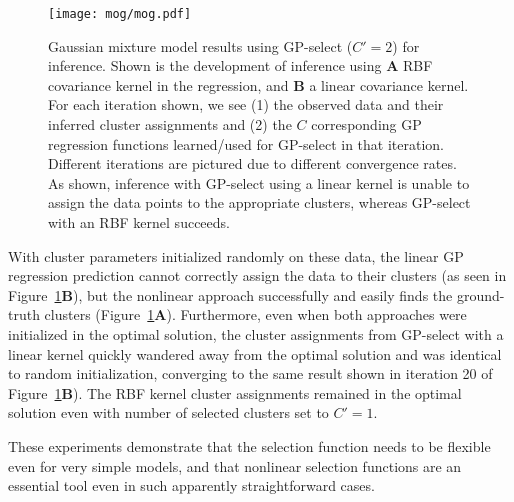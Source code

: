 \begin{figure}[t]
\begin{center}
\texttt{[image: mog/mog.pdf]}%
\caption{Gaussian mixture model results using GP-select ($C'=2$) for inference.
Shown is the development of inference using \textbf{A} RBF covariance kernel in the regression, and \textbf{B} a linear covariance kernel.
For each iteration shown, we see (1) the observed data and their inferred cluster assignments and (2) the $C$ corresponding GP regression functions learned/used for GP-select in that iteration. Different iterations are pictured due to different convergence rates. As shown, inference with GP-select using a linear kernel is unable to assign the data points to the appropriate clusters, whereas GP-select with an RBF kernel succeeds.}\label{fig:mog}%
\end{center}
\end{figure}

With cluster parameters initialized randomly on these data, the linear GP regression prediction cannot correctly assign the data to their clusters (as seen in Figure~\ref{fig:mog}\textbf{B}), but the nonlinear approach successfully and easily finds the ground-truth clusters (Figure~\ref{fig:mog}\textbf{A}).
Furthermore, even when both approaches were initialized in the optimal solution, the cluster assignments from GP-select with a linear kernel quickly wandered away from the optimal solution and was identical to random initialization, converging to the same result shown in iteration 20 of Figure~\ref{fig:mog}\textbf{B}).
The RBF kernel cluster assignments remained in the optimal solution even with number of selected clusters set to $C'=1$.


These experiments demonstrate that the selection function needs to be flexible even
for very simple models, and that nonlinear selection functions are an essential tool
even in such apparently straightforward cases.



